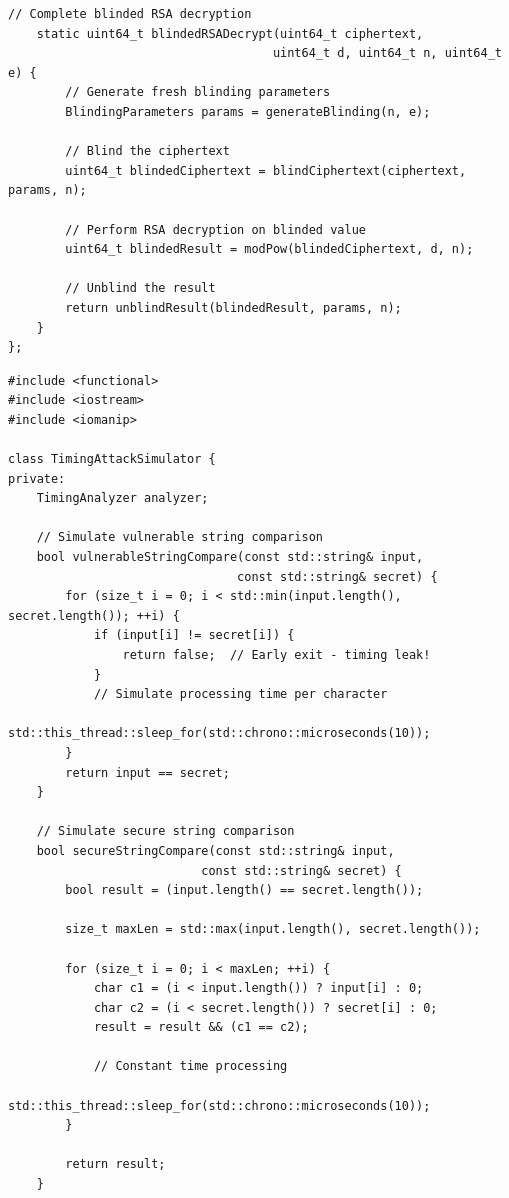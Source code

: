 \documentclass[12pt,a4paper]{article}
\theoremstyle{definition}
\begin{document}
\begin{lstlisting}[style=cryptoCode, caption={RSA Blinding Implementation}]
    // Complete blinded RSA decryption
    static uint64_t blindedRSADecrypt(uint64_t ciphertext,
                                     uint64_t d, uint64_t n, uint64_t e) {
        // Generate fresh blinding parameters
        BlindingParameters params = generateBlinding(n, e);
        
        // Blind the ciphertext
        uint64_t blindedCiphertext = blindCiphertext(ciphertext, params, n);
        
        // Perform RSA decryption on blinded value
        uint64_t blindedResult = modPow(blindedCiphertext, d, n);
        
        // Unblind the result
        return unblindResult(blindedResult, params, n);
    }
};
\end{lstlisting}

\begin{lstlisting}[style=cryptoCode, caption={Timing Attack Simulation Framework}]
#include <functional>
#include <iostream>
#include <iomanip>

class TimingAttackSimulator {
private:
    TimingAnalyzer analyzer;
    
    // Simulate vulnerable string comparison
    bool vulnerableStringCompare(const std::string& input, 
                                const std::string& secret) {
        for (size_t i = 0; i < std::min(input.length(), secret.length()); ++i) {
            if (input[i] != secret[i]) {
                return false;  // Early exit - timing leak!
            }
            // Simulate processing time per character
            std::this_thread::sleep_for(std::chrono::microseconds(10));
        }
        return input == secret;
    }
    
    // Simulate secure string comparison
    bool secureStringCompare(const std::string& input, 
                           const std::string& secret) {
        bool result = (input.length() == secret.length());
        
        size_t maxLen = std::max(input.length(), secret.length());
        
        for (size_t i = 0; i < maxLen; ++i) {
            char c1 = (i < input.length()) ? input[i] : 0;
            char c2 = (i < secret.length()) ? secret[i] : 0;
            result = result && (c1 == c2);
            
            // Constant time processing
            std::this_thread::sleep_for(std::chrono::microseconds(10));
        }
        
        return result;
    }
    

\end{lstlisting}
\end{document}
